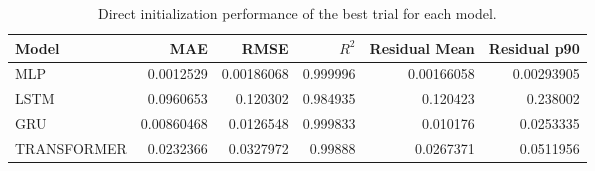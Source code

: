 \begin{table}
\caption{Direct initialization performance of the best trial for each model.}
\label{tab:direct_best_by_model}
\begin{tabular}{lrrrrr}
\toprule
Model & MAE & RMSE & $R^2$ & Residual Mean & Residual p90 \\
\midrule
MLP & 0.0012529 & 0.00186068 & 0.999996 & 0.00166058 & 0.00293905 \\
LSTM & 0.0960653 & 0.120302 & 0.984935 & 0.120423 & 0.238002 \\
GRU & 0.00860468 & 0.0126548 & 0.999833 & 0.010176 & 0.0253335 \\
TRANSFORMER & 0.0232366 & 0.0327972 & 0.99888 & 0.0267371 & 0.0511956 \\
\bottomrule
\end{tabular}
\end{table}
